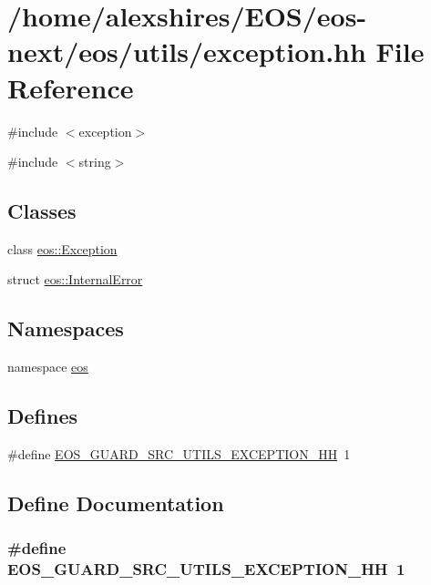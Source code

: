 \hypertarget{exception_8hh}{
\section{/home/alexshires/EOS/eos-\/next/eos/utils/exception.hh File Reference}
\label{exception_8hh}
}
{\ttfamily \#include $<$exception$>$}\par
{\ttfamily \#include $<$string$>$}\par
\subsection*{Classes}
\begin{DoxyCompactItemize}
\item 
class \hyperlink{classeos_1_1Exception}{eos::Exception}
\item 
struct \hyperlink{structeos_1_1InternalError}{eos::InternalError}
\end{DoxyCompactItemize}
\subsection*{Namespaces}
\begin{DoxyCompactItemize}
\item 
namespace \hyperlink{namespaceeos}{eos}
\end{DoxyCompactItemize}
\subsection*{Defines}
\begin{DoxyCompactItemize}
\item 
\#define \hyperlink{exception_8hh_a7c97e00f75990f4c9e9691efe6eaf396}{EOS\_\-GUARD\_\-SRC\_\-UTILS\_\-EXCEPTION\_\-HH}~1
\end{DoxyCompactItemize}


\subsection{Define Documentation}
\hypertarget{exception_8hh_a7c97e00f75990f4c9e9691efe6eaf396}{
\subsubsection[{EOS\_\-GUARD\_\-SRC\_\-UTILS\_\-EXCEPTION\_\-HH}]{\setlength{\rightskip}{0pt plus 5cm}\#define EOS\_\-GUARD\_\-SRC\_\-UTILS\_\-EXCEPTION\_\-HH~1}}
\label{exception_8hh_a7c97e00f75990f4c9e9691efe6eaf396}
